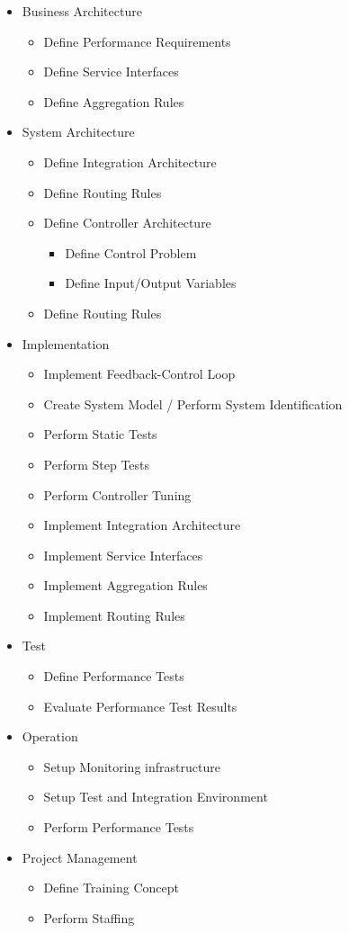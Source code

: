 \begin{itemize}
	\item Business Architecture
	\begin{itemize}
		\item Define Performance Requirements
		\item Define Service Interfaces
		\item Define Aggregation Rules
	\end{itemize}
	\item System Architecture 
	\begin{itemize}
		\item Define Integration Architecture
		\item Define Routing Rules
		\item Define Controller Architecture 
		\begin{itemize}
			\item Define Control Problem 
			\item Define Input/Output Variables 
		\end{itemize}
		\item Define Routing Rules
	\end{itemize}
	\item Implementation
	\begin{itemize}
		\item Implement Feedback-Control Loop
		\item Create System Model / Perform System Identification 
		\item Perform Static Tests
		\item Perform Step Tests
		\item Perform Controller Tuning 
		\item Implement Integration Architecture
		\item Implement Service Interfaces
		\item Implement Aggregation Rules 
		\item Implement Routing Rules
	\end{itemize}
	\item Test
	\begin{itemize}
		\item Define Performance Tests 
		\item Evaluate Performance Test Results
	\end{itemize}
	\item Operation
	\begin{itemize}
		\item Setup Monitoring infrastructure
		\item Setup Test and Integration Environment
		\item Perform Performance Tests
	\end{itemize} 
	\item Project Management
	\begin{itemize}
		\item Define Training Concept
		\item Perform Staffing
	\end{itemize}
\end{itemize}

